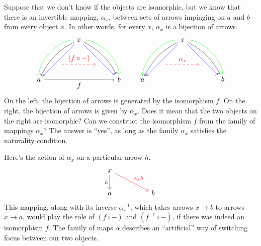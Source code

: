 \documentclass[DaoFP]{subfiles}
\begin{document}
Suppose that we don't know if the objects are isomorphic, but we know that there is an invertible mapping, $\alpha_x$, between sets of arrows impinging on $a$ and $b$ from every object $x$. In other words, for every $x$, $\alpha_x$ is a bijection of arrows. 
\[
 \begin{tikzcd}
 \node(x) at (0, 2) {x};
 \node(a) at (-2, 0) {a};
 \node(b) at (2, 0) {b};
 \node(c1) at (-1, 1.5) {};
 \node(c2) at (-1.5, 1) {};
 \node(c3) at (-1, 2) {};
 \node(c4) at (-2, 1) {};
 \node(d1) at (1, 1.5) {};
 \node(d2) at (1.5, 1) {};
 \node(d3) at (1, 2) {};
 \node(d4) at (2, 1) {};
\node (aa) at (-1, 0.75) {};
 \node (bb) at (1, 0.75) {};
 \draw[->] (x) .. controls (c1)  and (c2) .. (a); %
 \draw[->, green] (x) .. controls (c3)  and (c4) .. (a); %
 \draw[->, blue] (x) -- (a); 
  \draw[->] (x) .. controls (d1)  and (d2) .. (b); %
 \draw[->, green] (x) .. controls (d3)  and (d4) .. (b); %
 \draw[->, blue] (x) -- (b); 
 \draw[->, red, dashed] (aa) -- node[above]{(f \circ -)} (bb);
\draw[->] (a) -- node[below]{f} (b);
 \end{tikzcd}
 \qquad
 \begin{tikzcd}
 \node(x) at (0, 2) {x};
 \node(a) at (-2, 0) {a};
 \node(b) at (2, 0) {b};
 \node(c1) at (-1, 1.5) {};
 \node(c2) at (-1.5, 1) {};
 \node(c3) at (-1, 2) {};
 \node(c4) at (-2, 1) {};
 \node(d1) at (1, 1.5) {};
 \node(d2) at (1.5, 1) {};
 \node(d3) at (1, 2) {};
 \node(d4) at (2, 1) {};
\node (aa) at (-1, 0.75) {};
 \node (bb) at (1, 0.75) {};
 \draw[->] (x) .. controls (c1)  and (c2) .. (a); %
 \draw[->, green] (x) .. controls (c3)  and (c4) .. (a); %
 \draw[->, blue] (x) -- (a); 
  \draw[->] (x) .. controls (d1)  and (d2) .. (b); %
 \draw[->, green] (x) .. controls (d3)  and (d4) .. (b); %
 \draw[->, blue] (x) -- (b); 
 \draw[->, red, dashed] (aa) -- node[above]{\alpha_x} (bb);
 \end{tikzcd}
\]
On the left, the bijection of arrows is generated by the isomorphism $f$. On the right, the bijection of arrows is given by $\alpha_x$. Does it mean that the two objects on the right are isomorphic? Can we construct the isomorphism $f$ from the family of mappings $\alpha_x$? The answer is ``yes'', as long as the family $\alpha_x$ satisfies the naturality condition.

Here's the action of $\alpha_x$ on a particular arrow $h$. 
\[
 \begin{tikzcd}
 x
 \arrow[d, "h"']
 \arrow[rrd, red, "\alpha_x h"]
  \\
 a
  && b
 \end{tikzcd}
\]
This mapping, along with its inverse $\alpha^{-1}_x$, which takes arrows $x \to b$ to arrows $x \to a$, would play the role of $(f \circ -)$ and $(f^{-1} \circ -)$, if there was indeed an isomorphism $f$. The family of maps $\alpha$ describes an ``artificial'' way of switching focus between our two objects.
\end{document}
